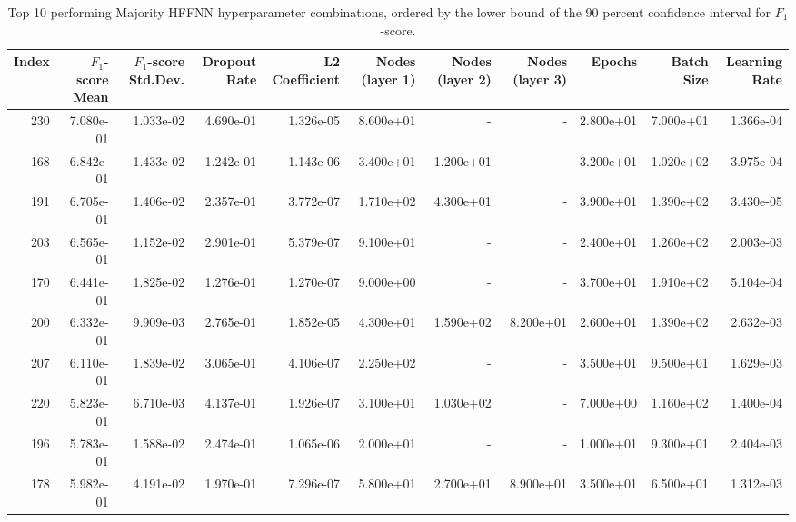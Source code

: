 \begin{table}
\caption[Best HFFNN Majority Hyperparameter Combinations]{Top 10 performing Majority HFFNN hyperparameter combinations, ordered by the lower bound of the 90 percent confidence interval for $F_1$-score.}
\label{tab:appendix_best_majority_hffnn_hpars}
\begin{adjustbox}{width=1\textwidth}
\begin{tabular}{rrrrrrrrrrr}
\toprule
Index & $F_1$-score Mean & $F_1$-score Std.Dev. & Dropout Rate & L2 Coefficient & Nodes (layer 1) & Nodes (layer 2) & Nodes (layer 3) & Epochs & Batch Size & Learning Rate \\
\midrule
230 & 7.080e-01 & 1.033e-02 & 4.690e-01 & 1.326e-05 & 8.600e+01 & - & - & 2.800e+01 & 7.000e+01 & 1.366e-04 \\
168 & 6.842e-01 & 1.433e-02 & 1.242e-01 & 1.143e-06 & 3.400e+01 & 1.200e+01 & - & 3.200e+01 & 1.020e+02 & 3.975e-04 \\
191 & 6.705e-01 & 1.406e-02 & 2.357e-01 & 3.772e-07 & 1.710e+02 & 4.300e+01 & - & 3.900e+01 & 1.390e+02 & 3.430e-05 \\
203 & 6.565e-01 & 1.152e-02 & 2.901e-01 & 5.379e-07 & 9.100e+01 & - & - & 2.400e+01 & 1.260e+02 & 2.003e-03 \\
170 & 6.441e-01 & 1.825e-02 & 1.276e-01 & 1.270e-07 & 9.000e+00 & - & - & 3.700e+01 & 1.910e+02 & 5.104e-04 \\
200 & 6.332e-01 & 9.909e-03 & 2.765e-01 & 1.852e-05 & 4.300e+01 & 1.590e+02 & 8.200e+01 & 2.600e+01 & 1.390e+02 & 2.632e-03 \\
207 & 6.110e-01 & 1.839e-02 & 3.065e-01 & 4.106e-07 & 2.250e+02 & - & - & 3.500e+01 & 9.500e+01 & 1.629e-03 \\
220 & 5.823e-01 & 6.710e-03 & 4.137e-01 & 1.926e-07 & 3.100e+01 & 1.030e+02 & - & 7.000e+00 & 1.160e+02 & 1.400e-04 \\
196 & 5.783e-01 & 1.588e-02 & 2.474e-01 & 1.065e-06 & 2.000e+01 & - & - & 1.000e+01 & 9.300e+01 & 2.404e-03 \\
178 & 5.982e-01 & 4.191e-02 & 1.970e-01 & 7.296e-07 & 5.800e+01 & 2.700e+01 & 8.900e+01 & 3.500e+01 & 6.500e+01 & 1.312e-03 \\
\bottomrule
\end{tabular}
\end{adjustbox}
\end{table}
